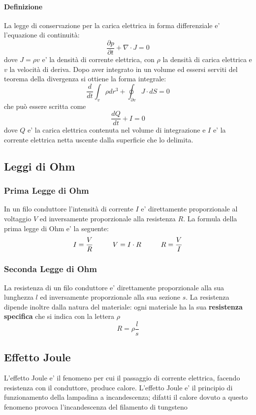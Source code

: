 \documentclass[a4paper, 10pt]{article}
\begin{document}
			\paragraph*{Definizione}
			La legge di conservazione per la carica elettrica in forma differenziale e' l'equazione di continuità:
			\[ \frac{\partial p}{\partial t} + \nabla \cdot J = 0 \] dove $J = \rho v$ e' la densità di corrente elettrica, 
			con $\rho$ la densità di carica elettrica e $v$ la velocità di deriva. Dopo aver integrato in un volume ed essersi 
			serviti del teorema della divergenza si ottiene la forma integrale:
			\[ \frac{d}{dt} \int_{v} \rho d r^3 + \oint_{\partial v} J \cdot dS = 0 \] che può essere scritta come
			\[ \frac{dQ}{dt} + I = 0 \] dove $Q$ e' la carica elettrica contenuta nel volume di integrazione e $I$ e' 
			la corrente elettrica netta uscente dalla superficie che lo delimita. 
		\subsection{Leggi di Ohm}
			\subsubsection{Prima Legge di Ohm}
				In un filo conduttore l'intensità di corrente $I$ e' direttamente proporzionale al voltaggio $V$ ed 
				inversamente proporzionale alla resistenza $R$. La formula della prima legge di Ohm e' la seguente: 
				\[ I = \frac{V}{R} \hspace{1.0cm} V = I \cdot R \hspace{1.0cm} R = \frac{V}{I} \]
			\subsubsection{Seconda Legge di Ohm}
				La resistenza di un filo conduttore e' direttamente proporzionale alla sua lunghezza $l$ ed 
				inversamente proporzionale alla sua sezione $s$. La resistenza dipende inoltre dalla natura del 
				materiale: ogni materiale ha la sua \textbf{resistenza specifica} che si indica con la lettera $\rho$
				\[ R = \rho \frac{l}{s} \]
		\subsection{Effetto Joule}
			L'effetto Joule e' il fenomeno per cui il passaggio di corrente elettrica, facendo resistenza con il conduttore, 
			produce calore. L'effetto Joule e' il principio di funzionamento della lampadina a incandescenza; difatti il 
			calore dovuto a questo fenomeno provoca l'incandescenza del filamento di tungsteno
\end{document}
